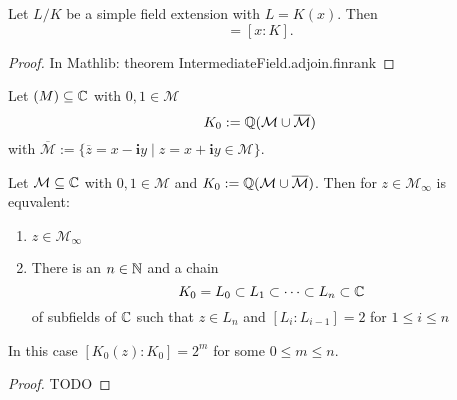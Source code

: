 \documentclass{../Proof_layout_PDF/TemplateExercise}
\begin{document}
\begin{theorem}
\label{thm:degree_of_simple_field_extension}
    Let $L/K$ be a simple field extension with $L = K(x)$. Then
    \begin{equation*}
        [L:K] = [x:K].
    \end{equation*}
\end{theorem}
\begin{proof}
    In Mathlib: theorem IntermediateField.adjoin.finrank
\end{proof}
\begin{definition}
    Let $\mathcal(M)\subseteq\mathbb{C}$ with $0,1 \in \mathcal{M}$
    \begin{equation*}
        K_0 := \mathbb{Q}(\mathcal{M}\cup \overline{\mathcal{M}})
    \end{equation*}
    with $\overline{\mathcal{M}} := \{ \overline{z} = x - \textbf{i}y \mid z = x+\textbf{i}y  \in \mathcal{M} \}$.
\end{definition}
\begin{theorem}
\label{thm:degree_of_constructable_points}
    Let $\mathcal{M}\subseteq\mathbb{C}$ with $0,1 \in \mathcal{M}$ and $K_0 := \mathbb{Q}(\mathcal{M}\cup \overline{\mathcal{M}})$.
    Then for $z \in \mathcal{M}_{\infty}$ is equvalent:
    \begin{enumerate}
        \item $z \in \mathcal{M}_{\infty}$
        \item There is an $n \in \mathbb{N}$ and a chain \begin{equation*}
            K_0 = L_0 \subset L_1 \subset \dots \subset L_n \subset \mathbb{C}
        \end{equation*}
        of subfields of $\mathbb{C}$ such that $z \in L_n$ and $[L_i:L_{i-1}] =2$ for $1\le i\le n$ %
    \end{enumerate}
    In this case $[K_0(z):K_0] = 2^m$ for some $0 \le m \le n$.
\end{theorem}
\begin{proof}
   TODO %
\end{proof}
\end{document}
